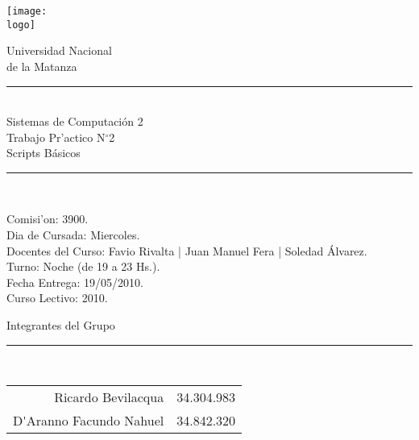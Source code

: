 

\newcommand{\materia}{Sistemas de Computaci\'on 2}
\newcommand{\team}{Grupo N$^{\circ}$63}
\newcommand{\comision}{3900}
\newcommand{\diacursada}{Miercoles}
\newcommand{\turno}{Noche (de 19 a 23 Hs.)}
\newcommand{\anio}{2010}
\newcommand{\fecha}{19/05/2010}
\newcommand{\numtp}{2}
\newcommand{\nomtp}{Scripts B\'asicos}
\newcommand{\docentes}{Favio Rivalta | Juan Manuel Fera | Soledad \'Alvarez}
\newcommand{\logo}{/home/ric/Documentos/Facultad/Varios/logoUnlam.png}

%
\thispagestyle{empty}

\begin{center}

 \texttt{[image: \\logo]}
 

\huge{Universidad Nacional\\de la Matanza}\\
\end{center}


\begin{center}
\rule{30mm}{.1pt}\\
\huge{\materia}\\
\huge{Trabajo Pr'actico N$^{\circ}$\numtp\\\nomtp}\\
\rule[5mm]{30mm}{.1pt}\\
\end{center}
Comisi'on: \comision.\\
Dia de Cursada: \diacursada.\\
Docentes del Curso: \docentes.\\
Turno: \turno.\\
Fecha Entrega: \fecha.\\
Curso Lectivo: \anio.



\begin{center}

\Large{Integrantes del Grupo}\\
\rule[2.5mm]{15mm}{.1pt}\\

\begin{tabular}{r|r}
Ricardo Bevilacqua & 34.304.983\\
D\'{ }Aranno Facundo Nahuel & 34.842.320
\end{tabular}



\end{center}
\newpage


%

